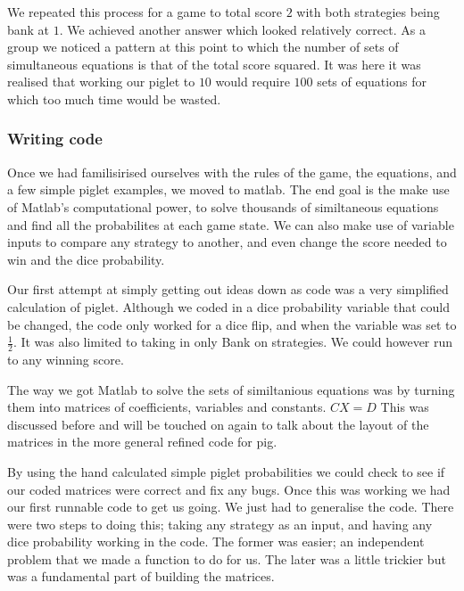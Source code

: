 \documentclass[a4paper,titlepage]{article}
\begin{document}
We repeated this process for a game to total score $2$ with both strategies being bank at $1$. We achieved another answer which looked relatively correct. As a group we noticed a pattern at this point to which the number of sets of simultaneous equations is that of the total score squared. It was here it was realised that working our piglet to $10$ would require $100$ sets of equations for which too much time would be wasted.

\subsubsection{Writing code}


Once we had familisirised ourselves with the rules of the game, the equations, and
a few simple piglet examples, we moved to matlab.
The end goal is the make use of Matlab's computational power, to solve thousands of
similtaneous equations and find all the probabilites at each game state.
We can also make use of variable inputs to compare any strategy to another, and
even change the score needed to win and the dice probability.

Our first attempt at simply getting out ideas down as code was a very simplified
calculation of piglet. Although we coded in a dice probability variable that could be changed,
the code only worked for a dice flip, and when the variable was set to $\frac{1}{2}$.
It was also limited to taking in only Bank on strategies.
We could however run to any winning score.

The way we got Matlab to solve the sets of similtanious equations was by turning them into
matrices of coefficients, variables and constants. $CX=D$ This was discussed before
and will be touched on again to talk about the layout of the matrices in the more general
refined code for pig.

By using the hand calculated simple piglet probabilities we could check to see if our
coded matrices were correct and fix any bugs. Once this was working we had our first
runnable code to get us going. We just had to generalise the code.
There were two steps to doing this; taking any strategy as an input, and having any
dice probability working in the code. The former was easier; an independent problem that we
made a function to do for us. The later was a little trickier but was a fundamental part
of building the matrices.
\end{document}

